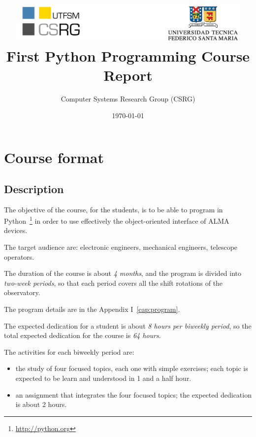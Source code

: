\documentclass[letter, 10pt]{article}
\begin{document}
\title{\includegraphics[width=0.9\textwidth]{img/logos.pdf}\\\vspace{1cm}
First Python Programming Course Report}
\author{Computer Systems Research Group (CSRG)}
\date{\today}

\maketitle

\section{Course format}

\subsection{Description}

The objective of the course, for the students,
is to be able to program in Python~\footnote{\url{http://python.org}}
in order to use effectively the object-oriented interface of ALMA devices.

The target audience are: electronic engineers, mechanical engineers, telescope operators. 

The duration of the course is about \emph{4 months}, and the program is divided into \emph{two-week periods},
so that each period covers all the shift rotations of the observatory.

The program details are in the Appendix I~\ref{cap:program}.

The expected dedication for a student is about \emph{8 hours per biweekly period},
so the total expected dedication for the course is \emph{64 hours}.

The activities for each biweekly period are:
\begin{itemize}
    \item the study of four focused topics, each one with simple exercises;
          each topic is expected to be learn and understood in 1 and a half hour.
    \item an assignment that integrates the four focused topics;
          the expected dedication is about 2 hours.
\end{itemize}
\end{document}
